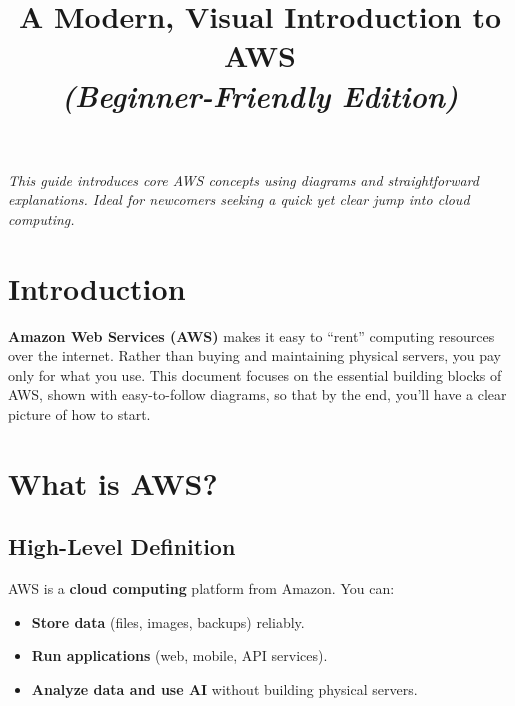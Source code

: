 \documentclass[12pt]{article}
\title{%
  \vspace{-1.5cm}
  \color{mainDark}\Huge A Modern, Visual Introduction to AWS \\
  \vspace{0.1cm}
  \large \textit{(Beginner-Friendly Edition)}
}
\author{}
\date{}
\begin{document}
\maketitle

\thispagestyle{empty}
\vfill
\begin{center}
    \textit{\color{mainDark}
        This guide introduces core AWS concepts using diagrams and
        straightforward explanations. Ideal for newcomers seeking a
        quick yet clear jump into cloud computing.
    }
\end{center}
\vfill
\clearpage

\tableofcontents
\clearpage

\section*{Introduction}
\justifying

\textbf{Amazon Web Services (AWS)} makes it easy to “rent” computing resources over the internet. Rather than buying and maintaining physical servers, you pay only for what you use. This document focuses on the essential building blocks of AWS, shown with easy-to-follow diagrams, so that by the end, you’ll have a clear picture of how to start.

\clearpage

\section{What is AWS?}
\justifying

\subsection{High-Level Definition}
AWS is a \textbf{cloud computing} platform from Amazon. You can:
\begin{itemize}
    \item \textbf{Store data} (files, images, backups) reliably.
    \item \textbf{Run applications} (web, mobile, API services).
    \item \textbf{Analyze data and use AI} without building physical servers.
\end{itemize}
\end{document}
